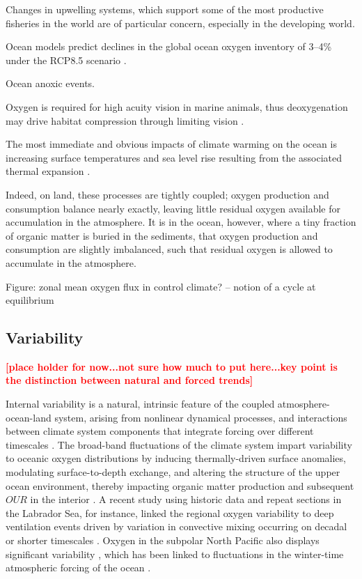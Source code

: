 \documentclass[draft,linenumbers]{report_chapter}
\newcommand{\note}[1]{\textcolor{red}{\footnotesize\textbf{[#1]}}}
\begin{document}
	Changes in upwelling systems, which support some of the most productive fisheries in the world are of particular concern, especially in the developing world.

	Ocean models predict declines in the global ocean oxygen inventory of 3--4\% under the RCP8.5 scenario \citep{Bopp-Resplandy-etal-2013}.


	Ocean anoxic events.

	Oxygen is required for high acuity vision in marine animals, thus deoxygenation may drive habitat compression through limiting vision \citep{McCormick-Levin-2017}.

	The most immediate and obvious impacts of climate warming on the ocean is increasing surface temperatures and sea level rise resulting from the associated thermal expansion \citep{Rhein-Rintoul-etal-2013}.


	Indeed, on land, these processes are tightly coupled; oxygen production and consumption balance nearly exactly, leaving little residual oxygen available for accumulation in the atmosphere.
	It is in the ocean, however, where a tiny fraction of organic matter is buried in the sediments,  that oxygen production and consumption are slightly imbalanced, such that residual oxygen is allowed to accumulate in the atmosphere.


	Figure: zonal mean oxygen flux in control climate?
		-- notion of a cycle at equilibrium

		\subsection{Variability}\label{loc:historical-var}

		\note{place holder for now...not sure how much to put here...key point is the distinction between natural and forced trends}

		Internal variability is a natural, intrinsic feature of the coupled atmosphere-ocean-land system, arising from nonlinear dynamical processes, and interactions between climate system components that integrate forcing over different timescales \citep{Hasselmann-1976}.
		The broad-band fluctuations of the climate system impart variability to oceanic oxygen distributions by inducing thermally-driven surface anomalies, modulating surface-to-depth exchange, and altering the structure of the upper ocean environment, thereby impacting organic matter production and subsequent $OUR$ in the interior \citep{Ito-Deutsch-2010,Deutsch-Brix-etal-2011}.
		A recent study using historic data and repeat sections in the Labrador Sea, for instance, linked the regional oxygen variability to deep ventilation events driven by variation in convective mixing occurring on decadal or shorter timescales \citep{van-Aken-Femke-de-Jong-etal-2011}.
		Oxygen in the subpolar North Pacific also displays significant variability \citep{Deutsch-Emerson-etal-2006}, which has been linked to fluctuations in the winter-time atmospheric forcing of the ocean \citep{Andreev-Baturina-2006}.


\end{document}
